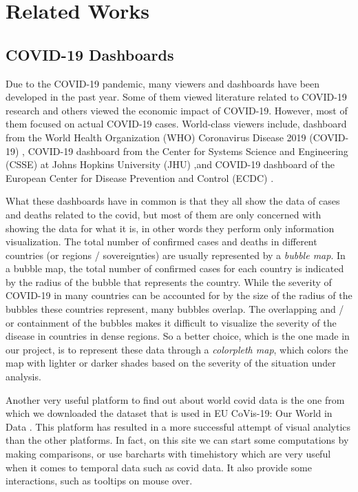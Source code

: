 \documentclass[10pt,conference]{IEEEtran}
\begin{document}
\smallbreak

\section{Related Works}

\subsection{COVID-19 Dashboards}
Due to the COVID-19 pandemic, many viewers and dashboards have been developed in the past year. Some of them \cite{vis1, vis2, vis3} 
viewed literature related to COVID-19 research and others \cite{vis4} viewed the economic impact of COVID-19. 
However, most of them \cite{vis5} focused on actual COVID-19 cases. World-class viewers include, dashboard from the World Health 
Organization (WHO) Coronavirus Disease 2019 (COVID-19) \cite{vis6}, COVID-19 dashboard from the Center for Systems Science and Engineering 
(CSSE) at Johns Hopkins University (JHU) \cite{vis7},and COVID-19 dashboard of the European Center for Disease Prevention and Control (ECDC) \cite{vis8}.

What these dashboards have in common is that they all show the data of cases and deaths related to the covid, but most of them are only 
concerned with showing the data for what it is, in other words they perform only information visualization.
The total number of confirmed cases and deaths in different countries (or regions / sovereignties) are usually represented by a {\em bubble map}. 
In a bubble map, the total number of confirmed cases for each country is indicated by the radius of the bubble that represents the country. 
While the severity of COVID-19 in many countries can be accounted for by the size of the radius of the bubbles these countries represent, 
many bubbles overlap. The overlapping and / or containment of the bubbles makes it difficult to visualize the severity of the disease 
in countries in dense regions.
So a better choice, which is the one made in our project, is to represent these data through a {\em colorpleth map}, which colors the 
map with lighter or darker shades based on the severity of the situation under analysis.

Another very useful platform to find out about world covid data is the one from which we downloaded the dataset that is used in 
EU CoVis-19: Our World in Data \cite{vis9}. This platform has resulted in a more successful attempt of visual analytics than the other platforms. 
In fact, on this site we can start some computations by making comparisons, or use barcharts with timehistory which are very useful 
when it comes to temporal data such as covid data. It also provide some interactions, such as tooltips on mouse over. 
\end{document}
